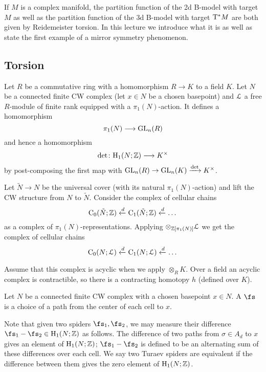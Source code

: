 

If $M$ is a complex manifold, the partition function of the 2d B-model with target $M$ as well as the partition function of the 3d B-model with target $\mathrm{T}^* M$ are both given by Reidemeister torsion. In this lecture we introduce what it is as well as state the first example of a mirror symmetry phenomenon.

\subsection{Torsion}

Let $R$ be a commutative ring with a homomorphism $R\rightarrow K$ to a field $K$. Let $N$ be a connected finite CW complex (let $x\in N$ be a chosen basepoint) and $\mathcal{L}$ a free $R$-module of finite rank equipped with a $\pi_1(N)$-action. It defines a homomorphism
\[\pi_1(N)\longrightarrow \mathrm{GL}_n(R)\]
and hence a homomorphism
\[\det\colon \mathrm{H}_1(N;\mathbb{Z})\longrightarrow K^\times\]
by post-composing the first map with $\mathrm{GL}_n(R)\rightarrow \mathrm{GL}_n(K)\xrightarrow{\det} K^\times$.

Let $\tilde{N}\rightarrow N$ be the universal cover (with its natural $\pi_1(N)$-action) and lift the CW structure from $N$ to $\tilde{N}$. Consider the complex of cellular chains
\[\mathrm{C}_0(\tilde{N}; \mathbb{Z})\xleftarrow{d} \mathrm{C}_1(\tilde{N}; \mathbb{Z})\xleftarrow{d} \dots\]
as a complex of $\pi_1(N)$-representations. Applying $\otimes_{\mathbb{Z}[\pi_1(N)]}\mathcal{L}$ we get the complex of cellular chains
\[\mathrm{C}_0(N; \mathcal{L})\xleftarrow{d} \mathrm{C}_1(N; \mathcal{L})\xleftarrow{d} \dots\]

Assume that this complex is acyclic when we apply $\otimes_R K$. Over a field an acyclic complex is contractible, so there is a contracting homotopy $h$ (defined over $K$).

\begin{defn}
	Let $N$ be a connected finite CW complex with a chosen basepoint $x\in N$. A  $\fs$ is a choice of a path from the center of each cell to $x$.
\end{defn}

Note that given two spiders $\fs_1,\fs_2$, we may measure their difference $\fs_1-\fs_2\in\rH_1(N;\Z)$ as follows. The difference of two paths from $\sigma\in A_d$ to $x$ gives an element of $\mathrm{H}_1(N; \mathbb{Z})$; $\fs_1-\fs_2$ is defined to be an alternating sum of these differences over each cell. We say two Turaev spiders are equivalent if the difference between them gives the zero element of $\mathrm{H}_1(N; \mathbb{Z})$.

